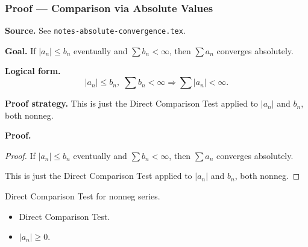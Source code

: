 
\clearpage
{}
\hypertarget{proof-RA-ABB-T-comparison-abs-values}{}

\subsubsection[Comparison via Absolute Values]{Proof --- Comparison via Absolute Values}

\bigskip

\noindent
\textbf{Source.} See \texttt{notes-absolute-convergence.tex}.

\vspace{0.75em}

\noindent
\textbf{Goal.} If $|a_n| \le b_n$ eventually and $\sum b_n < \infty$, then $\sum a_n$ converges absolutely.

\vspace{0.75em}

\noindent
\textbf{Logical form.}
\[
  |a_n| \le b_n,\; \sum b_n < \infty \Rightarrow \sum |a_n| < \infty.
\]

\vspace{0.75em}

\noindent
\textbf{Proof strategy.} This is just the Direct Comparison Test applied to $|a_n|$ and $b_n$, both nonneg.

\vspace{0.75em}

\noindent
\textbf{Proof.}
\begin{proof}
\Claim If $|a_n| \le b_n$ eventually and $\sum b_n < \infty$, then $\sum a_n$ converges absolutely.

\Given 

\Goal 

\Strategy This is just the Direct Comparison Test applied to $|a_n|$ and $b_n$, both nonneg.

\medskip


\end{proof}

\begin{remark*}
Direct Comparison Test for nonneg series.
\end{remark*}

\begin{remark*}[Dependencies]
\begin{itemize}
  \item Direct Comparison Test.
  \item $|a_n| \ge 0$.
\end{itemize}
\end{remark*}
